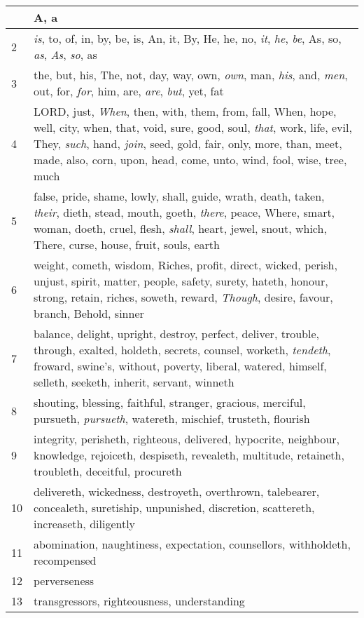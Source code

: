 \begin{center}
\begin{longtable}{l|p{3.75in}}
\hline \hline 
\endlastfoot 
1 & A, a\\ \hline 
2 & \emph{is}, to, of, in, by, be, is, An, it, By, He, he, no, \emph{it}, \emph{he}, \emph{be}, As, so, \emph{as}, \emph{As}, \emph{so}, as\\ \hline 
3 & the, but, his, The, not, day, way, own, \emph{own}, man, \emph{his}, and, \emph{men}, out, for, \emph{for}, him, are, \emph{are}, \emph{but}, yet, fat\\ \hline 
4 & LORD, just, \emph{When}, then, with, them, from, fall, When, hope, well, city, when, that, void, sure, good, soul, \emph{that}, work, life, evil, They, \emph{such}, hand, \emph{join}, seed, gold, fair, only, more, than, meet, made, also, corn, upon, head, come, unto, wind, fool, wise, tree, much\\ \hline 
5 & false, pride, shame, lowly, shall, guide, wrath, death, taken, \emph{their}, dieth, stead, mouth, goeth, \emph{there}, peace, Where, smart, woman, doeth, cruel, flesh, \emph{shall}, heart, jewel, snout, which, There, curse, house, fruit, souls, earth\\ \hline 
6 & weight, cometh, wisdom, Riches, profit, direct, wicked, perish, unjust, spirit, matter, people, safety, surety, hateth, honour, strong, retain, riches, soweth, reward, \emph{Though}, desire, favour, branch, Behold, sinner\\ \hline 
7 & balance, delight, upright, destroy, perfect, deliver, trouble, through, exalted, holdeth, secrets, counsel, worketh, \emph{tendeth}, froward, swine's, without, poverty, liberal, watered, himself, selleth, seeketh, inherit, servant, winneth\\ \hline 
8 & shouting, blessing, faithful, stranger, gracious, merciful, pursueth, \emph{pursueth}, watereth, mischief, trusteth, flourish\\ \hline 
9 & integrity, perisheth, righteous, delivered, hypocrite, neighbour, knowledge, rejoiceth, despiseth, revealeth, multitude, retaineth, troubleth, deceitful, procureth\\ \hline 
10 & delivereth, wickedness, destroyeth, overthrown, talebearer, concealeth, suretiship, unpunished, discretion, scattereth, increaseth, diligently\\ \hline 
11 & abomination, naughtiness, expectation, counsellors, withholdeth, recompensed\\ \hline 
12 & perverseness\\ \hline 
13 & transgressors, righteousness, understanding\\ \hline 
\end{longtable} 
\end{center} 




 
